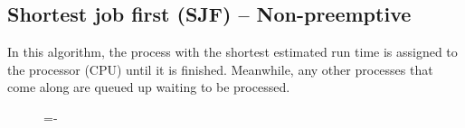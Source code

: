 \documentclass[a4paper]{systems-software}
\begin{document}
\subsection*{Shortest job first (SJF) – Non-preemptive}

In this algorithm, the process with the shortest estimated run time is assigned to the processor (CPU) until it is finished. Meanwhile, any other processes that come along are queued up waiting to be processed.

\begin{figure}[H]
  \lineskip=-\fboxrule
\end{figure}
\end{document}
